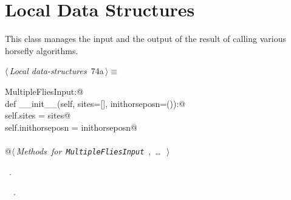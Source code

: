 \documentclass[11.5pt]{report}
\begin{document}
\needspace{7cm}
\section{Local Data Structures}


\newchunk This class manages the input and the output of the result of 
calling various horsefly algorithms. 

\begin{flushleft} \small
\begin{minipage}{\linewidth}\label{scrap109}\raggedright\small
{} $\langle\,${\itshape Local data-structures}\nobreak\ {\footnotesize {74a}}$\,\rangle\equiv$
\vspace{-1ex}
\begin{list}{}{} \item
\mbox{}\verb@class MultipleFliesInput:@\\
\mbox{}\verb@      def __init__(self, sites=[], inithorseposn=()):@\\
\mbox{}\verb@           self.sites           = sites@\\
\mbox{}\verb@           self.inithorseposn   = inithorseposn@\\
\mbox{}\verb@@\\
\mbox{}\verb@      @\hbox{$\langle\,${\itshape Methods for \verb|MultipleFliesInput|}\nobreak\ {\footnotesize {}, \ldots\ }$\,\rangle$}\verb@@\\
\mbox{}\verb@@{\NWsep}
\end{list}
\vspace{-1.5ex}
\footnotesize
\begin{list}{}{\setlength{\itemsep}{-\parsep}\setlength{\itemindent}{-\leftmargin}}
\item \NWtxtMacroRefIn\ .
\item \NWtxtIdentsDefed\nobreak\  \verb@HorseFlyInput@\nobreak\ \NWtxtIdentsNotUsed.
\item{}
\end{list}
\end{minipage}\vspace{4ex}
\end{flushleft}
\end{document}
